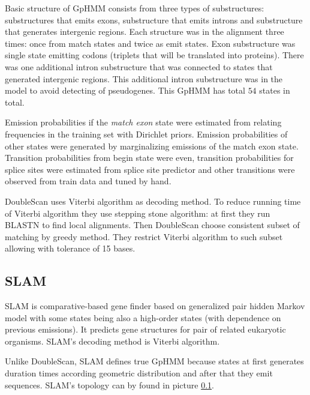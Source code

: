 Basic structure of GpHMM consists from three types of substructures:
substructures that emits exons, substructure that emits introns and substructure
that generates intergenic regions. Each structure was in the alignment three
times: once from match states and twice as emit states. Exon substructure was
single state emitting codons (triplets that will be translated into proteins).
There was one additional intron substructure that was connected to states that
generated intergenic regions. This additional intron substructure was in the
model to avoid detecting of pseudogenes. This GpHMM has total $54$ states in
total.

\nocite{Meyer2002}

Emission probabilities if the {\it match exon} state were estimated from
relating frequencies in the training set with Dirichlet priors.
Emission probabilities of other states were generated  by marginalizing
emissions of the match exon state. Transition probabilities from begin state
were even, transition probabilities for splice sites were estimated from splice
site predictor and other transitions were observed from train data and tuned by
hand.

DoubleScan uses Viterbi algorithm as decoding method.  To reduce running time of
Viterbi algorithm they use stepping stone algorithm: at first they run BLASTN to
find local alignments. Then DoubleScan choose consistent subset of matching by
greedy method. They restrict Viterbi algorithm to such subset allowing with
tolerance of 15 bases.

\subsection{SLAM} 

SLAM is comparative-based gene finder \cite{SLAM2003} based on generalized pair
hidden Markov model \cite{Alexanderson2004} with some states being also a
high-order states (with dependence on previous emissions).  It predicts gene
structures for pair of related eukaryotic organisms. SLAM's decoding method is
Viterbi algorithm. 

Unlike DoubleScan, SLAM defines true GpHMM because states at first generates
duration times according geometric distribution and after that they emit
sequences. SLAM's topology can by found in picture \ref{}. 


